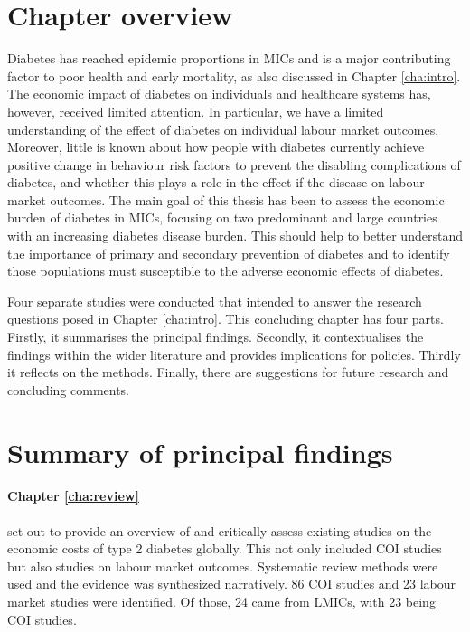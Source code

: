 \section{Chapter overview}
Diabetes has reached epidemic proportions in \acp{MIC} and is a major contributing factor to poor health and early mortality, as also discussed in Chapter \ref{cha:intro}. The economic impact of diabetes on individuals and healthcare systems has, however, received limited attention. In particular, we have a limited understanding of the effect of diabetes on individual labour market outcomes. Moreover, little is known about how people with diabetes currently achieve positive change in behaviour risk factors to prevent the disabling complications of diabetes, and whether this plays a role in the effect if the disease on labour market outcomes. The main goal of this thesis has been to assess the economic burden of diabetes in \acp{MIC}, focusing on two predominant and large countries with an increasing diabetes disease burden. This should help to better understand the importance of primary and secondary prevention of diabetes and to identify those populations must susceptible to the adverse economic effects of diabetes.

Four separate studies were conducted that intended to answer the research questions posed in Chapter \ref{cha:intro}. This concluding chapter has four parts. Firstly, it summarises the principal findings. Secondly, it contextualises the findings within the wider literature and provides implications for policies. Thirdly it reflects on the methods. Finally, there are suggestions for future research and concluding comments.

\section{Summary of principal findings}



\paragraph{Chapter \ref{cha:review}} set out to provide an overview of and critically assess existing studies on the economic costs of type 2 diabetes globally. This not only included \ac{COI} studies but also studies on labour market outcomes. Systematic review methods were used and the evidence was synthesized narratively. 86 \ac{COI} studies and 23 labour market studies were identified. Of those, 24 came from \acp{LMIC}, with 23 being \ac{COI} studies.

